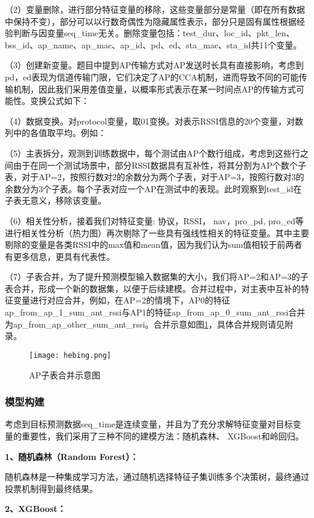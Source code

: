 \documentclass[bwprint]{gmcmthesis}
\begin{document}
（2）变量删除，进行部分特征变量的移除，这些变量部分是常量（即在所有数据中保持不变），部分可以以行数奇偶性为隐藏属性表示，部分只是固有属性根据经验判断与因变量seq\_time无关。删除变量包括：test\_dur、loc\_id、pkt\_len、bss\_id、ap\_name、ap\_mac、ap\_id、pd、ed、sta\_mac、sta\_id共11个变量。

（3）创建新变量。题目中提到AP传输方式对AP发送时长具有直接影响，考虑到pd，ed表现为信道传输门限，它们决定了AP的CCA机制，进而导致不同的可能传输机制，因此我们采用差值变量，以概率形式表示在某一时间点AP的传输方式可能性。变换公式如下：

（4）数据变换。对protocol变量，取01变换。对表示RSSI信息的20个变量，对数列中的各值取平均。例如：

（5）主表拆分，观测到训练数据中，每个测试由AP个数行组成，考虑到这些行之间由于在同一个测试场景中，部分RSSI数据具有互补性，将其分割为AP个数个子表，对于AP=2，按照行数对2的余数分为两个子表，对于AP=3，按照行数对3的余数分为3个子表。每个子表对应一个AP在测试中的表现。此时观察到test\_id在子表无意义，移除该变量。

（6）相关性分析，接着我们对特征变量: 协议，RSSI， nav，pro\_pd, pro\_ed等进行相关性分析（热力图）再次剔除了一些具有强线性相关的特征变量。其中主要剔除的变量是各类RSSI中的max值和mean值，因为我们认为sum值相较于前两者有更多信息，更具有代表性。

（7）子表合并，为了提升预测模型输入数据集的大小，我们将AP=2和AP=3的子表合并，形成一个新的数据集，以便于后续建模。合并过程中，对主表中互补的特征变量进行对应合并，例如，在AP=2的情境下，AP0的特征ap\_from\_ap\_1\_sum\_ant\_rssi与AP1的特征ap\_from\_ap\_0\_sum\_ant\_rssi合并为ap\_from\_ap\_other\_sum\_ant\_rssi。合并示意如图\ref{pho:hebing}，具体合并规则请见附录。

\begin{figure}[!htbp]
    \centering
    \texttt{[image: hebing.png]}
    \caption{\centering AP子表合并示意图}
    \label{pho:hebing}
\end{figure}
\subsubsection{模型构建}
 考虑到目标预测数据seq\_time是连续变量，并且为了充分求解特征变量对目标变量的重要性，我们采用了三种不同的建模方法：随机森林、
 XGBoost和岭回归。

 \textbf{1、随机森林（Random Forest）：}
 
 随机森林是一种集成学习方法，通过随机选择特征子集训练多个决策树，最终通过投票机制得到最终结果。
 
 \textbf{2、XGBoost：}
 
\end{document}
